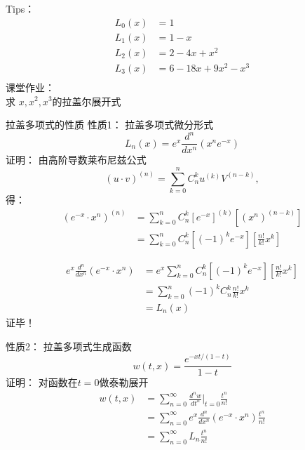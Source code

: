 	{Tips：}
	\begin{equation*}
	\begin{split}
		L_0(x)&=1\\
		L_1(x)&=1-x\\
		L_2(x)&=2-4x+x^2\\
		L_3(x)&=6-18x+9x^2-x^3\\
	\end{split}		
	\end{equation*}	
	课堂作业：\\
	求 $x, x^2, x^3 $的拉盖尔展开式
	



	{拉盖多项式的性质}
	{\alert{性质1：}}  拉盖多项式微分形式
	\begin{equation*}
		L_n(x) =e^x \frac{d ^n}{d x^n} (x^n e^{-x})
	\end{equation*}	
	{\alert{	证明：}}  由高阶导数莱布尼兹公式 
	\begin{equation*}
		(u\cdot v) ^{(n)} =\sum_{k=0}^{n} C^k _n u^{(k) }V^{(n-k)}, 
	\end{equation*}	
	得：
	\begin{equation*}
	\begin{split}
		(e^{-x}\cdot x^n) ^{(n)}&= \sum_{k=0}^{n} C^k _n [ e ^{-x}]^{(k)}   [(x^n)^{(n-k)}]\\
		&= \sum_{k=0}^{n} C^k _n [(-1)^k e ^{-x}]   [ \frac{n!}{k!} x^k]
	\end{split}		
	\end{equation*}	
		


	\begin{equation*}
	\begin{split}
		e^x \frac{d^n }{d x^n} (e^{-x}\cdot x^n) &=e^x \sum_{k=0}^{n} C^k _n [(-1)^k e ^{-x}]   [ \frac{n!}{k!}  x^k]\\
		&= \sum_{k=0}^{n} (-1)^k C^k _n \frac{n!}{k!}x^k  \\
		&=L_n (x)		
	\end{split}		
	\end{equation*}	
	{\alert{	证毕！}}
		


	{\alert{	性质2：}}  拉盖多项式生成函数
	\begin{equation*}
		w(t,x) =\frac{e^{-xt/(1-t) } } {1-t}
	\end{equation*}	
	{\alert{	证明：}}  对函数在$t=0$做泰勒展开
	\begin{equation*}
	\begin{split}
		w(t,x) &= \sum_{n=0}^{\infty} \frac{d^n w}{d t^n} |_{t=0} \frac{t^n}{n!}   \\
		&= \sum_{n=0}^{\infty}  e^x \frac{d^n }{d x^n} (e^{-x}\cdot x^n) \frac{t^n}{n!}\\
		&= \sum_{n=0}^{\infty}  L_n  \frac{t^n}{n!}
	\end{split}		
	\end{equation*}	
		


